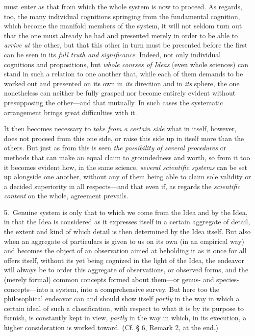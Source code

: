 \documentclass[12pt,a4paper]{book}
\begin{document}
must enter as that from which the whole system is now to proceed. As regards, too, the
many individual cognitions springing from the fundamental cognition, which become the
manifold members of the system, it will not seldom turn out that the one must already be
had and presented merely in order to be able to \emph{arrive at} the other, but that this
other in turn must be presented before the first can be seen in its \emph{full truth
and significance}. Indeed, not only individual cognitions and propositions, but \emph{whole
courses of Ideas} (even whole sciences) can stand in such a relation to one another that,
while each of them demands to be worked out and presented on its own in \emph{its} direction and
in \emph{its} sphere, the one nonetheless can neither be fully grasped nor become entirely evident
without presupposing the other---and that mutually. In such cases the systematic
arrangement brings great difficulties with it.

It then becomes necessary to \emph{take from a certain side} what in itself, however, does
not proceed from this one side, or raise this side up in itself more than the others. But
just as from this is seen \emph{the possibility of several procedures} or methods that can
make an equal claim to groundedness and worth, so from it too it becomes evident how, in
the same science, \emph{several scientific systems} can be set up alongside one another,
without any of them being able to claim sole validity or a decided superiority in all
respects---and that even if, as regards the \emph{scientific content} on the whole, agreement
prevails.

5.~Genuine system is only that to which we come from the Idea and by the Idea, in that the
Idea is considered as it expresses itself in a certain aggregate of detail, the extent and
kind of which detail is then determined by the Idea itself. But also when an aggregate of
particulars is given to us on its own (in an empirical way) and becomes the object of an
observation aimed at beholding it as it once for all offers itself, without its yet being
cognized in the light of the Idea, the endeavor will always be to order this aggregate of
observations, or observed forms, and the (merely formal) common concepts formed about
them---or genus- and species-concepts---into a system, into a comprehensive survey. But
here too the philosophical endeavor can and should show itself \emph{partly} in the way in
which a certain ideal of such a classification, with respect to what it is by its purpose
to furnish, is constantly kept in view, \emph{partly} in the way in which, in its
execution, a higher consideration is worked toward. (Cf. § 6, Remark 2, at the end.)
\end{document}
